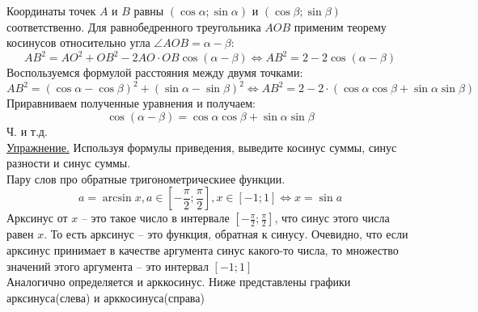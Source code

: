 \documentclass{article}
\begin{document}
Координаты точек $A$ и $B$ равны $(\cos \alpha; \sin \alpha)$ и $(\cos \beta; \sin \beta)$ соответственно. 
Для равнобедренного треугольника \( AOB \) применим теорему косинусов относительно угла 
\( \angle AOB = \alpha - \beta \):
\[ AB^2 = AO^2 + OB^2 - 2AO \cdot OB \cos (\alpha - \beta)
\Leftrightarrow AB^2 = 2 - 2\cos (\alpha - \beta)\]
Воспользуемся формулой расстояния между двумя точками:
\[ AB^2 = (\cos \alpha - \cos \beta)^2 + (\sin \alpha - \sin \beta)^2
\Leftrightarrow AB^2 = 2 - 2 \cdot (\cos \alpha \cos \beta + \sin \alpha \sin \beta) \]
Приравниваем полученные уравнения и получаем:
\[ \cos (\alpha - \beta) = \cos \alpha \cos \beta + \sin \alpha \sin \beta \]
Ч. и т.д.
\\
\underline{Упражнение.} Используя формулы приведения, 
выведите косинус суммы, синус разности и синус суммы.
\\
Пару слов про обратные тригонометрическиее функции. 
\[ a = \arcsin x, a \in [-\frac{\pi}{2};\frac{\pi}{2}], x \in [-1;1] 
\Leftrightarrow x = \sin a \]
Арксинус от $x$ -- это такое число в интервале $[-\frac{\pi}{2};\frac{\pi}{2}]$, что синус этого числа равен $x$. 
То есть арксинус -- это функция, обратная к синусу. Очевидно, что если
арксинус принимает в качестве аргумента синус какого-то числа, то множество значений этого аргумента -- это интервал $[-1; 1]$
\\
Аналогично определяется и арккосинус. Ниже представлены графики арксинуса(слева) и арккосинуса(справа)
\end{document}
